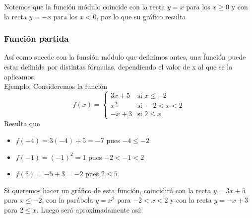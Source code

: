 \documentclass[../Teoría.root.tex]{subfiles}
\begin{document}
Notemos que la función módulo coincide con la recta \(y=x\) para los \(x\geq 0\) y con la recta \(y=−x\) para los \(x<0\), por lo que su gráfico resulta
\begin{center}
\end{center}
\subsubsection{Función partida}
Así como sucede con la función módulo que definimos antes, una función puede estar definida por distintas fórmulas, dependiendo el valor de x al que se la aplicamos.\\
Ejemplo.
Consideremos la función
\[f(x)=
    \begin{cases}
        3x+5 & \text{si }x\leq -2 \\
        x^2  & \text{si }-2<x<2   \\
        -x+3 & \text{si }2\leq x
    \end{cases}
\]
Resulta que
\begin{itemize}
    \item \(f(-4)=3(-4)+5=-7\) pues \(-4\leq -2\)
    \item \(f(-1)=(-1)^2=1\) pues \(-2< -1<2\)
    \item \(f(5)=-5+3=-2\) pues \(2\leq 5\)
\end{itemize}
Si queremos hacer un gráfico de esta función, coincidirá con la recta \(y =3x+5\) para \(x\leq−2\), con la parábola \(y=x^2\) para \(−2<x<2\) y con la recta \(y=−x+3\) para \(2\leq x\).
Luego será aproximadamente así:
\begin{center}
\end{center}
\end{document}
